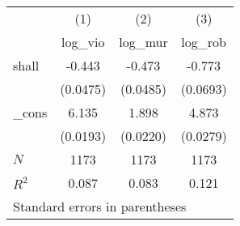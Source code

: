 \begin{tabular}{l*{3}{c}}
\toprule
            &\multicolumn{1}{c}{(1)}&\multicolumn{1}{c}{(2)}&\multicolumn{1}{c}{(3)}\\
            &\multicolumn{1}{c}{log\_vio}&\multicolumn{1}{c}{log\_mur}&\multicolumn{1}{c}{log\_rob}\\
\midrule
shall       &      -0.443&      -0.473&      -0.773\\
            &    (0.0475)&    (0.0485)&    (0.0693)\\
\addlinespace
\_cons      &       6.135&       1.898&       4.873\\
            &    (0.0193)&    (0.0220)&    (0.0279)\\
\midrule
\(N\)       &        1173&        1173&        1173\\
\(R^{2}\)   &       0.087&       0.083&       0.121\\
\bottomrule
\multicolumn{4}{l}{\footnotesize Standard errors in parentheses}\\
\end{tabular}
